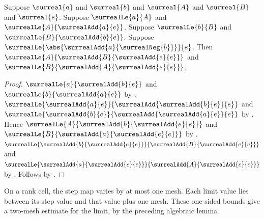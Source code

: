 \begin{lemma}\label{surreal_one_sided_approximations_oscillation}
    Suppose $\surreal{a}$ and $\surreal{b}$ and
        $\surreal{A}$ and $\surreal{B}$ and $\surreal{e}$.
    Suppose $\surrealLe{a}{A}$ and
        $\surrealLe{A}{\surrealAdd{a}{e}}$.
    Suppose $\surrealLe{b}{B}$ and
        $\surrealLe{B}{\surrealAdd{b}{e}}$.
    Suppose
        $\surrealLe{\abs{\surrealAdd{a}{\surrealNeg{b}}}}{e}$.
    Then
        $\surrealLe{A}{\surrealAdd{B}{\surrealAdd{e}{e}}}$ and
        $\surrealLe{B}{\surrealAdd{A}{\surrealAdd{e}{e}}}$.
\end{lemma}
\begin{proof}
    $\surrealLe{a}{\surrealAdd{b}{e}}$ and
        $\surrealLe{b}{\surrealAdd{a}{e}}$
        by .
    $\surrealLe{\surrealAdd{a}{e}}
        {\surrealAdd{\surrealAdd{b}{e}}{e}}$ and
        $\surrealLe{\surrealAdd{b}{e}}
        {\surrealAdd{\surrealAdd{a}{e}}{e}}$
        by .
    Hence
        $\surrealLe{A}{\surrealAdd{b}{\surrealAdd{e}{e}}}$ and
        $\surrealLe{B}{\surrealAdd{a}{\surrealAdd{e}{e}}}$
        by
        .
    $\surrealLe{\surrealAdd{b}{\surrealAdd{e}{e}}}
        {\surrealAdd{B}{\surrealAdd{e}{e}}}$ and
        $\surrealLe{\surrealAdd{a}{\surrealAdd{e}{e}}}
        {\surrealAdd{A}{\surrealAdd{e}{e}}}$
        by .
    Follows by
        .
\end{proof}

On a rank cell, the step map varies by at most one mesh. Each limit value lies
between its step value and that value plus one mesh. These one-sided bounds
give a two-mesh estimate for the limit, by the preceding algebraic lemma.

